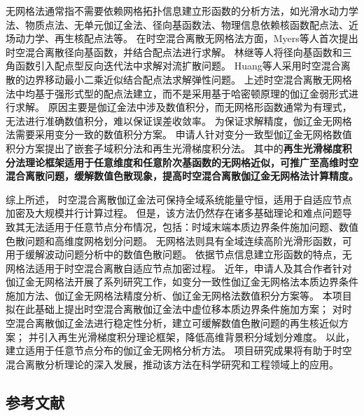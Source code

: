 无网格法通常指不需要依赖网格拓扑信息建立形函数的分析方法，如光滑水动力学法\cite{Yang2019,Chang2011}、物质点法\cite{Kan2022}、无单元伽辽金法\cite{Wu2016d,Cheng2024}、径向基函数法\cite{jiang2025}、物理信息依赖核函数配点法\cite{FuZhuoJia2022}、近场动力学\cite{Gu2016,Zhang2022}、再生核配点法\cite{Hu2023}等。
在时空混合离散无网格法方面，Myers等人\cite{myers2002}首次提出时空混合离散径向基函数，并结合配点法进行求解。
林继等人\cite{lin2021}将径向基函数和三角函数引入配点型反向迭代法中求解对流扩散问题。
Huang等人\cite{huang2023}采用时空混合离散的边界移动最小二乘近似结合配点法求解弹性问题。
上述时空混合离散无网格法中均基于强形式型的配点法建立，而不是采用基于哈密顿原理的伽辽金弱形式进行求解。
原因主要是伽辽金法中涉及数值积分，而无网格形函数通常为有理式，无法进行准确数值积分，难以保证误差收敛率\cite{wu2021}。
为保证求解精度，伽辽金无网格法需要采用变分一致的数值积分方案\cite{Wu2016d}。
申请人针对变分一致型伽辽金无网格数值积分方案提出了嵌套子域积分法\cite{wang2016b}和再生光滑梯度积分法\cite{wang2019a}。
其中的\textbf{再生光滑梯度积分法理论框架适用于任意维度和任意阶次基函数的无网格近似，可推广至高维时空混合离散问题，缓解数值色散现象，提高时空混合离散伽辽金无网格法计算精度。}

综上所述，
时空混合离散伽辽金法可保持全域系统能量守恒，适用于自适应节点加密及大规模并行计算过程。
但是，该方法仍然存在诸多基础理论和难点问题导致其无法适用于任意节点分布情况，包括：时域末端本质边界条件施加问题、数值色散问题和高维度网格划分问题。
无网格法则具有全域连续高阶光滑形函数，可用于缓解波动问题分析中的数值色散问题。
依据节点信息建立形函数的特点，无网格法适用于时空混合离散自适应节点加密过程。
近年，申请人及其合作者针对伽辽金无网格法开展了系列研究工作，如变分一致性伽辽金无网格法本质边界条件施加方法\cite{Wu2022b,wu2023,wu2024}、伽辽金无网格法精度分析\cite{wu2021,wu2018a}、伽辽金无网格法数值积分方案\cite{Wu2016d,wang2016b,wang2019a}等。
本项目拟在此基础上提出时空混合离散伽辽金法中虚位移本质边界条件施加方案；
对时空混合离散伽辽金法进行稳定性分析，建立可缓解数值色散问题的再生核近似方案；
并引入再生光滑梯度积分理论框架，降低高维背景积分域划分难度。
以此，建立适用于任意节点分布的伽辽金无网格分析方法。
项目研究成果将有助于时空混合离散分析理论的深入发展，推动该方法在科学研究和工程领域上的应用。

\vspace{-5pt}

\begin{REF}
	\subsection*{参考文献}
	\vspace{-50pt}
	
\end{REF}

\newpage%
